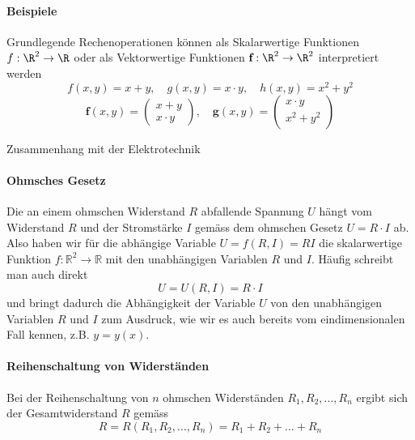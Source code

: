 \paragraph{Beispiele}

\begin{example2}{Grundlegende Rechenoperationen} können als Skalarwertige Funktionen $f: \R^2 \to \R$ oder als Vektorwertige Funktionen $\textbf{f}: \R^2 \to \R^2$ interpretiert werden
    $$f(x, y) = x + y, \quad g(x, y) = x \cdot y, \quad h(x, y) = x^2 + y^2$$
    $$\textbf{f}(x, y) = \begin{pmatrix} x + y \\ x \cdot y \end{pmatrix}, \quad \textbf{g}(x, y) = \begin{pmatrix} x \cdot y \\ x^2 + y^2 \end{pmatrix}$$
\end{example2}

\begin{example2}{Zusammenhang mit der Elektrotechnik}
    \paragraph{Ohmsches Gesetz}
    Die an einem ohmschen Widerstand $R$ abfallende Spannung $U$ hängt vom Widerstand $R$ und der Stromstärke $I$ gemäss dem ohmschen Gesetz $U=R \cdot I$ ab. Also haben wir für die abhängige Variable $U=f(R, I)=R I$ die skalarwertige Funktion $f: \mathbb{R}^2 \longrightarrow \mathbb{R}$ mit den unabhängigen Variablen $R$ und $I$. Häufig schreibt man auch direkt
    $$
    U=U(R, I)=R \cdot I
    $$
    und bringt dadurch die Abhängigkeit der Variable $U$ von den unabhängigen Variablen $R$ und $I$ zum Ausdruck, wie wir es auch bereits vom eindimensionalen Fall kennen, z.B. $y=y(x)$.

    \paragraph{Reihenschaltung von Widerständen}
    Bei der Reihenschaltung von $n$ ohmschen Widerständen $R_1, R_2, \ldots, R_n$ ergibt sich der Gesamtwiderstand $R$ gemäss
    $$
    R=R(R_1, R_2, \ldots, R_n)=R_1+R_2+\ldots+R_n
    $$    
\end{example2}

